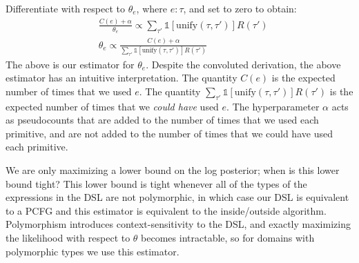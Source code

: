 \documentclass{article}
\newcommand{\indicator}{\mathds{1}} %
\begin{document}
Differentiate with respect to $\theta_e$, where $e:\tau$, and set to zero to obtain:
\begin{align}
  &  \frac{C(e) + \alpha}{\theta_e}\propto\sum_{\tau'}\indicator\left[\text{unify}(\tau,\tau') \right] R(\tau')\\
&  \theta_e\propto\frac{C(e) + \alpha}{\sum_{\tau'}\indicator\left[\text{unify}(\tau,\tau') \right] R(\tau')}
\end{align}
The above is our estimator for $\theta_e$.
Despite the convoluted derivation, the above estimator has an intuitive interpretation.
The quantity $C(e)$ is the expected number of times that we used $e$.
The quantity $\sum_{\tau'}\indicator\left[\text{unify}(\tau,\tau') \right] R(\tau')$
is the expected number of times that we \emph{could have} used $e$.
The hyperparameter $\alpha$ acts as pseudocounts that are
added to the number of times that we used each primitive,
and are not added to the number of times that we could have used each primitive.


We are only maximizing a lower bound on the log posterior; when is this lower bound tight?
This lower bound is tight whenever all
of the types of the expressions in the DSL are not polymorphic, in which case our DSL is equivalent to a PCFG
and this estimator is equivalent to the inside/outside algorithm.
Polymorphism introduces context-sensitivity to the DSL,
and exactly maximizing the likelihood with respect to $\theta$
becomes intractable,
so for domains with polymorphic types we use this estimator.
\end{document}
